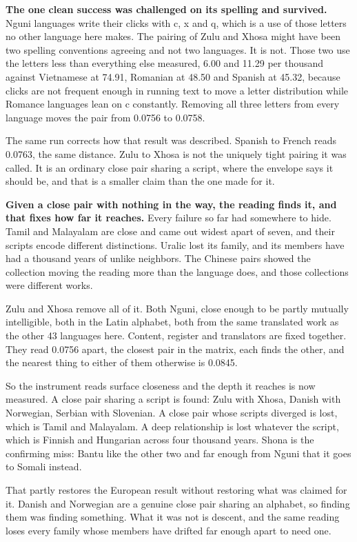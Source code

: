 \textbf{The one clean success was challenged on its spelling and survived.} Nguni languages write their clicks with c, x and q, which is a use of those letters no other language here makes. The pairing of Zulu and Xhosa might have been two spelling conventions agreeing and not two languages. It is not. Those two use the letters less than everything else measured, 6.00 and 11.29 per thousand against Vietnamese at 74.91, Romanian at 48.50 and Spanish at 45.32, because clicks are not frequent enough in running text to move a letter distribution while Romance languages lean on c constantly. Removing all three letters from every language moves the pair from 0.0756 to 0.0758.

The same run corrects how that result was described. Spanish to French reads 0.0763, the same distance. Zulu to Xhosa is not the uniquely tight pairing it was called. It is an ordinary close pair sharing a script, where the envelope says it should be, and that is a smaller claim than the one made for it.

\textbf{Given a close pair with nothing in the way, the reading finds it, and that fixes how far it reaches.} Every failure so far had somewhere to hide. Tamil and Malayalam are close and came out widest apart of seven, and their scripts encode different distinctions. Uralic lost its family, and its members have had a thousand years of unlike neighbors. The Chinese pairs showed the collection moving the reading more than the language does, and those collections were different works.

Zulu and Xhosa remove all of it. Both Nguni, close enough to be partly mutually intelligible, both in the Latin alphabet, both from the same translated work as the other 43 languages here. Content, register and translators are fixed together. They read 0.0756 apart, the closest pair in the matrix, each finds the other, and the nearest thing to either of them otherwise is 0.0845.

So the instrument reads surface closeness and the depth it reaches is now measured. A close pair sharing a script is found: Zulu with Xhosa, Danish with Norwegian, Serbian with Slovenian. A close pair whose scripts diverged is lost, which is Tamil and Malayalam. A deep relationship is lost whatever the script, which is Finnish and Hungarian across four thousand years. Shona is the confirming miss: Bantu like the other two and far enough from Nguni that it goes to Somali instead.

That partly restores the European result without restoring what was claimed for it. Danish and Norwegian are a genuine close pair sharing an alphabet, so finding them was finding something. What it was not is descent, and the same reading loses every family whose members have drifted far enough apart to need one.

